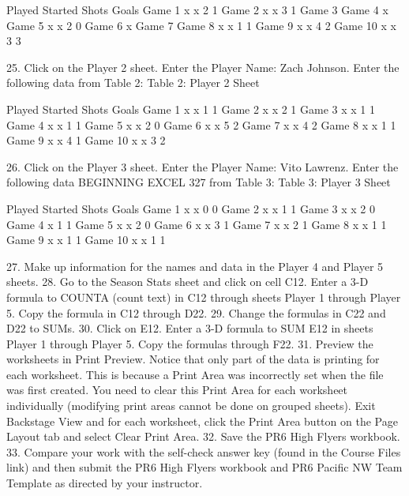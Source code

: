 Played Started Shots Goals
Game 1   x      x       2     1
Game 2   x      x       3     1
Game 3
Game 4   x
Game 5   x      x       2     0
Game 6   x
Game 7
Game 8   x      x       1     1
Game 9   x      x       4     2
Game 10 x       x       3     3

25. Click on the Player 2 sheet. Enter the Player Name: Zach Johnson. Enter the following data
from Table 2:
Table 2: Player 2 Sheet

Played Started Shots Goals
Game 1   x      x       1     1
Game 2   x      x       2     1
Game 3   x      x       1     1
Game 4   x      x       1     1
Game 5   x      x       2     0
Game 6   x      x       5     2
Game 7   x      x       4     2
Game 8   x      x       1     1
Game 9   x      x       4     1
Game 10 x       x       3     2

26. Click on the Player 3 sheet. Enter the Player Name: Vito Lawrenz. Enter the following data
BEGINNING EXCEL 327
from Table 3:
Table 3: Player 3 Sheet

Played Started Shots Goals
Game 1   x      x        0     0
Game 2   x      x        1     1
Game 3   x      x        2     0
Game 4   x               1     1
Game 5   x      x        2     0
Game 6   x      x        3     1
Game 7   x      x        2     1
Game 8   x      x        1     1
Game 9   x      x        1     1
Game 10 x       x        1     1

27. Make up information for the names and data in the Player 4 and Player 5 sheets.
28. Go to the Season Stats sheet and click on cell C12. Enter a 3-D formula to COUNTA (count
text) in C12 through sheets Player 1 through Player 5. Copy the formula in C12 through D22.
29. Change the formulas in C22 and D22 to SUMs.
30. Click on E12. Enter a 3-D formula to SUM E12 in sheets Player 1 through Player 5. Copy the
formulas through F22.
31. Preview the worksheets in Print Preview. Notice that only part of the data is printing for each
worksheet. This is because a Print Area was incorrectly set when the file was first created. You
need to clear this Print Area for each worksheet individually (modifying print areas cannot be
done on grouped sheets). Exit Backstage View and for each worksheet, click the Print Area
button on the Page Layout tab and select Clear Print Area.
32. Save the PR6 High Flyers workbook.
33. Compare your work with the self-check answer key (found in the Course Files link) and then
submit the PR6 High Flyers workbook and PR6 Pacific NW Team Template as directed by
your instructor.

